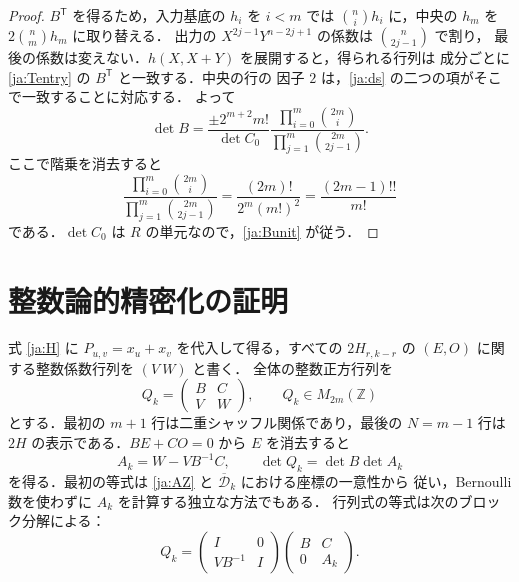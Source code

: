 \documentclass[12pt]{amsart}
\theoremstyle{definition}
\theoremstyle{remark}
\numberwithin{equation}{section}
\newcommand{\Z}{\mathbb{Z}}
\newcommand{\Dbar}{\overline{\mathcal D}_k}
\theoremstyle{definition}
\theoremstyle{remark}
\begin{document}
\begin{proof}
$B^{\mathsf T}$ を得るため，入力基底の $h_i$ を $i<m$ では
$\binom ni h_i$ に，中央の $h_m$ を $2\binom nm h_m$ に取り替える．
出力の $X^{2j-1}Y^{n-2j+1}$ の係数は $\binom n{2j-1}$ で割り，
最後の係数は変えない．$h(X,X+Y)$ を展開すると，得られる行列は
成分ごとに \eqref{ja:Tentry} の $B^{\mathsf T}$ と一致する．中央の行の
因子 $2$ は，\eqref{ja:ds} の二つの項がそこで一致することに対応する．
よって
\[
 \det B=\frac{\pm2^{m+2}m!}{\det C_0}
      \frac{\prod_{i=0}^m\binom{2m}{i}}
           {\prod_{j=1}^m\binom{2m}{2j-1}}.
\]
ここで階乗を消去すると
\[
 \frac{\prod_{i=0}^m\binom{2m}{i}}
      {\prod_{j=1}^m\binom{2m}{2j-1}}
 =\frac{(2m)!}{2^m(m!)^2}
 =\frac{(2m-1)!!}{m!}
\]
である．$\det C_0$ は $R$ の単元なので，\eqref{ja:Bunit} が従う．
\end{proof}

\section{整数論的精密化の証明}
式 \eqref{ja:H} に $P_{u,v}=x_u+x_v$ を代入して得る，すべての
$2H_{r,k-r}$ の $(E,O)$ に関する整数係数行列を $(V\ W)$ と書く．
全体の整数正方行列を
\begin{equation}\label{ja:Q}
 Q_k=\begin{pmatrix}B&C\\V&W\end{pmatrix},\qquad Q_k\in M_{2m}(\Z)
\end{equation}
とする．最初の $m+1$ 行は二重シャッフル関係であり，最後の $N=m-1$ 行は
$2H$ の表示である．$BE+CO=0$ から $E$ を消去すると
\begin{equation}\label{ja:schur}
 A_k=W-VB^{-1}C,\qquad \det Q_k=\det B\det A_k
\end{equation}
を得る．最初の等式は \eqref{ja:AZ} と $\Dbar$ における座標の一意性から
従い，Bernoulli 数を使わずに $A_k$ を計算する独立な方法でもある．
行列式の等式は次のブロック分解による：
\[
 Q_k=\begin{pmatrix}I&0\\VB^{-1}&I\end{pmatrix}
     \begin{pmatrix}B&C\\0&A_k\end{pmatrix}.
\]
\end{document}
